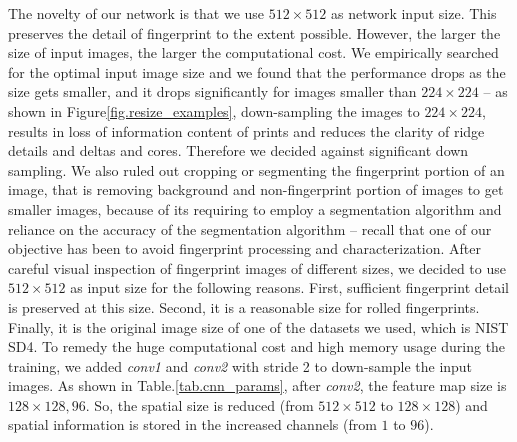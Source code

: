 The novelty of our network is that we use $512\times512$ as network input size. This preserves the detail of fingerprint to the extent possible. 
%
However, the larger the size of input images, the larger the computational cost.  We empirically searched for the optimal input image size and we found that the performance drops as the size gets smaller, and it drops significantly for images smaller than $224\times224$ -- as shown in Figure\ref{fig.resize_examples}, down-sampling the images to $224\times224$, results in loss of information content of prints and reduces the clarity of ridge details and deltas and cores. 
%
Therefore we decided against significant down sampling.  
%
We also ruled out cropping or segmenting the fingerprint portion of an image, that is removing background and non-fingerprint portion of images to get smaller images, because of its requiring to employ a segmentation algorithm and reliance on the accuracy of the segmentation algorithm -- recall that one of our objective has been to avoid fingerprint processing and characterization.
%
After careful visual inspection of fingerprint images of different sizes, we decided to use $512\times512$ as input size for the following reasons. 
%
First, sufficient fingerprint detail is preserved at this size. Second, it is a reasonable size for rolled fingerprints. Finally, it is the original image size of one of the datasets we used, which is NIST SD4.
%
To remedy the huge computational cost and high memory usage during the training, we added \textit{conv1} and \textit{conv2} with stride 2 to down-sample the input images. As shown in Table.\ref{tab.cnn_params}, after \textit{conv2}, the feature map size is $128\times128, 96$. So, the spatial size is reduced (from $512 \times 512$ to $128 \times 128$) and spatial information is stored in the increased channels (from $1$ to $96$).

